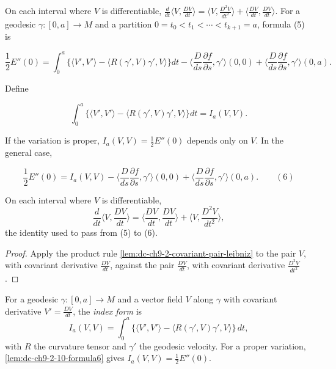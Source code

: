 \begin{remark}
  \label{rem:dc-ch9-2-10}
  On each interval where $V$ is differentiable,
  $\frac{d}{dt}\langle V,\frac{DV}{dt}\rangle=\langle V,\frac{D^2 V}{dt^2}\rangle+\langle\frac{DV}{dt},\frac{DV}{dt}\rangle$.
  For a geodesic $\gamma:[0,a]\to M$ and a partition
  $0=t_0<t_1<\cdots<t_{k+1}=a$, formula (5) is

  $$
  \frac{1}{2}E''(0)=\int_0^a\{\langle V',V'\rangle-\langle R(\gamma',V)\gamma',V\rangle\}dt-\Big\langle\frac{D}{ds}\frac{\partial f}{\partial s},\gamma'\Big\rangle(0,0)+\Big\langle\frac{D}{ds}\frac{\partial f}{\partial s},\gamma'\Big\rangle(0,a).
  $$

  Define

  $$
  \int_0^a\{\langle V',V'\rangle-\langle R(\gamma',V)\gamma',V\rangle\}dt=I_a(V,V).
  $$

  If the variation is proper, $I_a(V,V)=\frac{1}{2}E''(0)$ depends only on $V$. In
  the general case,

  $$
  \frac{1}{2}E''(0)=I_a(V,V)-\Big\langle\frac{D}{ds}\frac{\partial f}{\partial s},\gamma'\Big\rangle(0,0)+\Big\langle\frac{D}{ds}\frac{\partial f}{\partial s},\gamma'\Big\rangle(0,a).\qquad(6)
  $$
\end{remark}
\begin{lemma}
  \label{lem:dc-ch9-2-10-differentiation}
  \leanok
  On each interval where $V$ is differentiable,
  $$
  \frac{d}{dt}\Big\langle V,\frac{DV}{dt}\Big\rangle
    =\Big\langle\frac{DV}{dt},\frac{DV}{dt}\Big\rangle
     +\Big\langle V,\frac{D^2V}{dt^2}\Big\rangle,
  $$
  the identity used to pass from (5) to (6).
\end{lemma}
\begin{proof}
  \leanok
  \sketch
  Apply the product rule \cref{lem:dc-ch9-2-covariant-pair-leibniz} to the pair $V$, with
  covariant derivative $\frac{DV}{dt}$, against the pair $\frac{DV}{dt}$, with covariant
  derivative $\frac{D^2V}{dt^2}$.
\end{proof}
\begin{definition}
  \label{def:dc-ch9-2-10-index-form}
  \leanok
  For a geodesic $\gamma:[0,a]\to M$ and a vector field $V$ along $\gamma$ with covariant
  derivative $V'=\frac{DV}{dt}$, the \emph{index form} is
  $$
  I_a(V,V)=\int_0^a\{\langle V',V'\rangle-\langle R(\gamma',V)\gamma',V\rangle\}\,dt,
  $$
  with $R$ the curvature tensor and $\gamma'$ the geodesic velocity. For a
  proper variation, \cref{lem:dc-ch9-2-10-formula6} gives
  $I_a(V,V)=\frac{1}{2}E''(0)$.
\end{definition}
